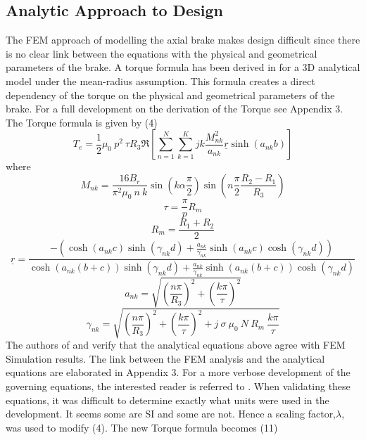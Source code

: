 \documentclass[lettersize,journal]{IEEEtran}
\begin{document}
\subsection{Analytic Approach to Design}
The FEM approach of modelling the axial brake makes design difficult since there is no clear link between the equations with the physical and geometrical parameters of the brake. A torque formula has been derived in \cite{Lu2021-lr} for a 3D analytical model under the mean-radius assumption. This formula creates a direct dependency of the torque on the physical and geometrical parameters of the brake. For a full development on the derivation of the Torque see Appendix 3. The Torque formula is given by (4)
\begin{equation}
T_e = \frac{1}{2}\mu_0\ p^2\ \tau R_3\mathfrak{R} \left[\sum_{n=1}^{N}\sum_{k=1}^{K} jk\frac{M^2_{nk}}{a_{nk}} \underline{r}\sinh(a_{nk}b) \right]
\end{equation}
where
\begin{equation}
M_{nk} = \frac{16B_r}{\pi^2\mu_0\ n\ k}\sin(k\alpha\frac{\pi}{2})\sin(n\frac{\pi}{2}\frac{R_2 - R_1}{R_3})
\end{equation}
\begin{equation}\tau = \frac{\pi}{p}R_m\end{equation}
\begin{equation}
R_m = \frac{R_1 + R_2}{2}
\end{equation}
\begin{equation}\underline{r} = \frac{-(\cosh(a_{nk}c)\sinh(\gamma_{nk}d)+\frac{a_{nk}}{\gamma_{nk}}\sinh(a_{nk}c)\cosh(\gamma_{nk}d))}{\cosh(a_{nk}(b+c))\sinh(\gamma_{nk}d)+\frac{a_{nk}}{\gamma_{nk}}\sinh(a_{nk}(b+c))\cosh(\gamma_{nk}d)}\end{equation}
\begin{equation}
a_{nk}=\sqrt{\left(\frac{n\pi}{R_3}\right)^2 + \left(\frac{k\pi}{\tau}\right)^2}
\end{equation}
\begin{equation}\gamma_{nk} = \sqrt{\left(\frac{n\pi}{R_3}\right)^{2}+\left(\frac{k\pi}{\tau}\right)^2 + j\ \sigma\ \mu_0\ N\ R_m\ \frac{k\pi}{\tau}}\end{equation}
The authors of \cite{fontchastagner_2018_design} and \cite{Lu2021-lr} verify that the analytical equations above agree with FEM Simulation results. The link between the FEM analysis and the analytical equations are elaborated in Appendix 3. For a more verbose development of the governing equations, the interested reader is referred to \cite{Lu2021-lr}. When validating these equations, it was difficult to determine exactly what units were used in the development. It seems some are SI and some are not. Hence a scaling factor,$\lambda$, was used to modify (4). The new Torque formula becomes (11)
\end{document}
